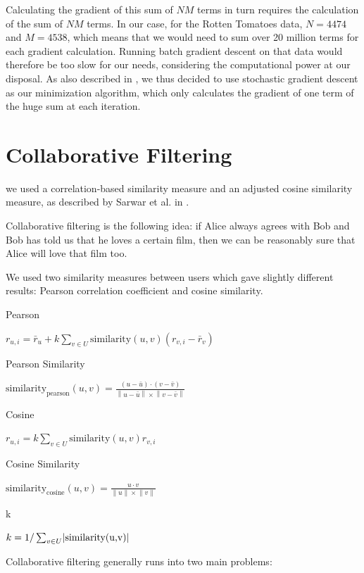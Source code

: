 \documentclass[12pt]{article}
\newcommand{\norm}[1]{\left\lVert#1\right\rVert}
\DeclarePairedDelimiter\abs{\lvert}{\rvert}%
\begin{document}
	Calculating the gradient of this sum of $NM$ terms in turn requires the calculation of the sum of $NM$ terms. In our case, for the Rotten Tomatoes data, $N = 4474$ and $M = 4538$, which means that we would need to sum over 20 million terms for each gradient calculation. Running batch gradient descent on that data would therefore be too slow for our needs, considering the computational power at our disposal. As also described in \cite{Koren09}, we thus decided to use stochastic gradient descent as our minimization algorithm, which only calculates the gradient of one term of the huge sum at each iteration.


\section{Collaborative Filtering}


we used a correlation-based similarity measure and an adjusted cosine similarity measure, as described by Sarwar et al. in \cite{Sarwar01}.

Collaborative filtering is the following idea: if Alice always agrees with Bob and Bob has told us that he loves a certain film, then we can be reasonably sure that Alice will love that film too.

We used two similarity measures between users which gave slightly different results: Pearson correlation coefficient and cosine similarity.






Pearson

\( r_{u,i} = \bar{r}_u + k \sum_{v \in U} \text{similarity}(u,v) (r_{v,i}-\bar{r}_v) \)

Pearson Similarity

\( \text{similarity}_{\text{pearson}}(u,v) = \frac{ (u - \bar{u}) \cdot (v - \bar{v})}{\norm{u - \bar{u}} \times \norm{v-\bar{v}}} \)

Cosine

\( r_{u,i} = k \sum_{v \in U} \text{similarity}(u,v) r_{v,i}  \)

Cosine Similarity

\( \text{similarity}_{\text{cosine}}(u,v) = \frac{u \cdot v}{\norm{u} \times \norm{v}} \)

k

\( k = 1 / \sum_{v \in U} \abs{\text{similarity(u,v)}} \)




Collaborative filtering generally runs into two main problems:
\end{document}
